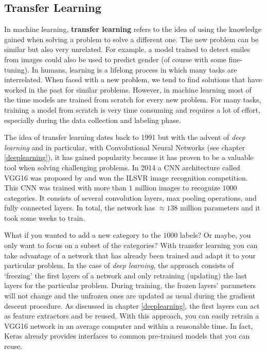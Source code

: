 \documentclass[
  11pt,
]{krantz}
\begin{document}
\hypertarget{transfer-learning}{%
\subsection{Transfer Learning}\label{transfer-learning}}

In machine learning, \textbf{transfer learning} refers to the idea of using the knowledge gained when solving a problem to solve a different one. The new problem can be similar but also very unrelated. For example, a model trained to detect smiles from images could also be used to predict gender (of course with some fine-tuning). In humans, learning is a lifelong process in which many tasks are interrelated. When faced with a new problem, we tend to find solutions that have worked in the past for similar problems. However, in machine learning most of the time models are trained from scratch for every new problem. For many tasks, training a model from scratch is very time consuming and requires a lot of effort, especially during the data collection and labeling phase.

The idea of transfer learning dates back to 1991 \citep{pratt1991} but with the advent of \emph{deep learning} and in particular, with Convolutional Neural Networks (see chapter \ref{deeplearning}), it has gained popularity because it has proven to be a valuable tool when solving challenging problems. In 2014 a CNN architecture called VGG16 was proposed by \citet{simonyan2014} and won the ILSVR image recognition competition. This CNN was trained with more than \(1\) million images to recognize \(1000\) categories. It consists of several convolution layers, max pooling operations, and fully connected layers. In total, the network has \(\approx 138\) million parameters and it took some weeks to train.

What if you wanted to add a new category to the \(1000\) labels? Or maybe, you only want to focus on a subset of the categories? With transfer learning you can take advantage of a network that has already been trained and adapt it to your particular problem. In the case of \emph{deep learning}, the approach consists of `freezing' the first layers of a network and only retraining (updating) the last layers for the particular problem. During training, the frozen layers' parameters will not change and the unfrozen ones are updated as usual during the gradient descent procedure. As discussed in chapter \ref{deeplearning}, the first layers can act as feature extractors and be reused. With this approach, you can easily retrain a VGG16 network in an average computer and within a reasonable time. In fact, Keras already provides interfaces to common pre-trained models that you can reuse.
\end{document}
